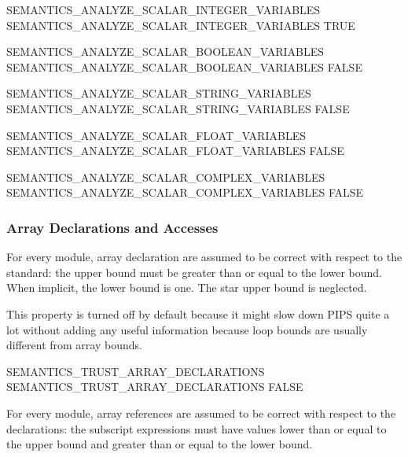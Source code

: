 \documentclass[a4paper]{report}
\begin{document}
\begin{PipsProp}{SEMANTICS_ANALYZE_SCALAR_INTEGER_VARIABLES}
SEMANTICS_ANALYZE_SCALAR_INTEGER_VARIABLES TRUE
\end{PipsProp}

\begin{PipsProp}{SEMANTICS_ANALYZE_SCALAR_BOOLEAN_VARIABLES}
SEMANTICS_ANALYZE_SCALAR_BOOLEAN_VARIABLES FALSE
\end{PipsProp}

\begin{PipsProp}{SEMANTICS_ANALYZE_SCALAR_STRING_VARIABLES}
SEMANTICS_ANALYZE_SCALAR_STRING_VARIABLES FALSE
\end{PipsProp}

\begin{PipsProp}{SEMANTICS_ANALYZE_SCALAR_FLOAT_VARIABLES}
SEMANTICS_ANALYZE_SCALAR_FLOAT_VARIABLES FALSE
\end{PipsProp}

\begin{PipsProp}{SEMANTICS_ANALYZE_SCALAR_COMPLEX_VARIABLES}
SEMANTICS_ANALYZE_SCALAR_COMPLEX_VARIABLES FALSE
\end{PipsProp}

\subsubsection{Array Declarations and Accesses}
\label{subsubsection:array-declarations-and-accesses}

For every module, array declaration are assumed to be correct with respect
to the standard: the upper bound must be greater than or equal to the
lower bound. When implicit, the lower bound is one. The star upper bound
is neglected.

This property is turned off by default because it might slow down PIPS
quite a lot without adding any useful information because loop bounds are
usually different from array bounds.

\begin{PipsProp}{SEMANTICS_TRUST_ARRAY_DECLARATIONS}
SEMANTICS_TRUST_ARRAY_DECLARATIONS FALSE
\end{PipsProp}

For every module, array references are assumed to be correct with respect
to the declarations: the subscript expressions must have values lower than
or equal to the upper bound and greater than or equal to the lower bound.
\end{document}
